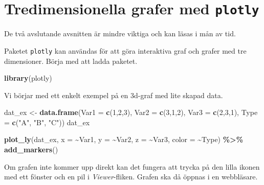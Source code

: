 \documentclass[
]{book}
\newenvironment{Shaded}{\begin{snugshade}}{\end{snugshade}}
\newcommand{\AttributeTok}[1]{\textcolor[rgb]{0.13,0.29,0.53}{#1}}
\newcommand{\DecValTok}[1]{\textcolor[rgb]{0.00,0.00,0.81}{#1}}
\newcommand{\FunctionTok}[1]{\textcolor[rgb]{0.13,0.29,0.53}{\textbf{#1}}}
\newcommand{\NormalTok}[1]{#1}
\newcommand{\OtherTok}[1]{\textcolor[rgb]{0.56,0.35,0.01}{#1}}
\newcommand{\SpecialCharTok}[1]{\textcolor[rgb]{0.81,0.36,0.00}{\textbf{#1}}}
\newcommand{\StringTok}[1]{\textcolor[rgb]{0.31,0.60,0.02}{#1}}
\theoremstyle{definition}
\theoremstyle{definition}
\theoremstyle{definition}
\theoremstyle{definition}
\theoremstyle{remark}
\begin{document}
\section{\texorpdfstring{Tredimensionella grafer med \texttt{plotly}}{Tredimensionella grafer med plotly}}\label{tredimensionella-grafer-med-plotly}

De två avslutande avsnitten är mindre viktiga och kan läsas i mån av tid.

Paketet \texttt{plotly} kan användas för att göra interaktiva graf och grafer med tre dimensioner. Börja med att ladda paketet.

\begin{Shaded}
\begin{Highlighting}[]
\FunctionTok{library}\NormalTok{(plotly)}
\end{Highlighting}
\end{Shaded}

Vi börjar med ett enkelt exempel på en 3d-graf med lite skapad data.

\begin{Shaded}
\begin{Highlighting}[]
\NormalTok{dat\_ex }\OtherTok{\textless{}{-}} \FunctionTok{data.frame}\NormalTok{(}\AttributeTok{Var1 =} \FunctionTok{c}\NormalTok{(}\DecValTok{1}\NormalTok{,}\DecValTok{2}\NormalTok{,}\DecValTok{3}\NormalTok{), }\AttributeTok{Var2 =} \FunctionTok{c}\NormalTok{(}\DecValTok{3}\NormalTok{,}\DecValTok{1}\NormalTok{,}\DecValTok{2}\NormalTok{), }
                     \AttributeTok{Var3 =} \FunctionTok{c}\NormalTok{(}\DecValTok{2}\NormalTok{,}\DecValTok{3}\NormalTok{,}\DecValTok{1}\NormalTok{), }\AttributeTok{Type =} \FunctionTok{c}\NormalTok{(}\StringTok{"A"}\NormalTok{, }\StringTok{"B"}\NormalTok{, }\StringTok{"C"}\NormalTok{))}
\NormalTok{dat\_ex}

\FunctionTok{plot\_ly}\NormalTok{(dat\_ex, }\AttributeTok{x =} \SpecialCharTok{\textasciitilde{}}\NormalTok{Var1, }\AttributeTok{y =} \SpecialCharTok{\textasciitilde{}}\NormalTok{Var2, }
        \AttributeTok{z =} \SpecialCharTok{\textasciitilde{}}\NormalTok{Var3, }\AttributeTok{color =} \SpecialCharTok{\textasciitilde{}}\NormalTok{Type) }\SpecialCharTok{\%\textgreater{}\%}
  \FunctionTok{add\_markers}\NormalTok{()}
\end{Highlighting}
\end{Shaded}

Om grafen inte kommer upp direkt kan det fungera att trycka på den lilla ikonen med ett fönster och en pil i \emph{Viewer}-fliken. Grafen ska då öppnas i en webbläsare.
\end{document}
